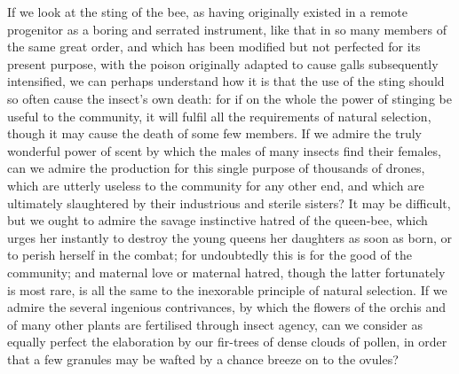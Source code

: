 If we look at the sting of the bee, as having originally existed in a remote progenitor as a boring and serrated instrument, like that in so many members of the same great order, and which has been modified but not perfected for its present purpose, with the poison originally adapted to cause galls subsequently intensified, we can perhaps understand how it is that the use of the sting should so often cause the insect's own death: for if on the whole the power of stinging be useful to the community, it will fulfil all the requirements of natural selection, though it may cause the death of some few members. If we admire the truly wonderful power of scent by which the males of many insects find their females, can we admire the production for this single purpose of thousands of drones, which are utterly useless to the community for any other end, and which are ultimately slaughtered by their industrious and sterile sisters? It may be difficult, but we ought to admire the savage instinctive hatred of the queen-bee, which urges her instantly to destroy the young queens her daughters as soon as born, or to perish herself in the combat; for undoubtedly this is for the good of the community; and maternal love or maternal hatred, though the latter fortunately is most rare, is all the same to the inexorable principle of natural selection. If we admire the several ingenious contrivances, by which the flowers of the orchis and of many other plants are fertilised through insect agency, can we consider as equally perfect the elaboration by our fir-trees of dense clouds of pollen, in order that a few granules may be wafted by a chance breeze on to the ovules?

